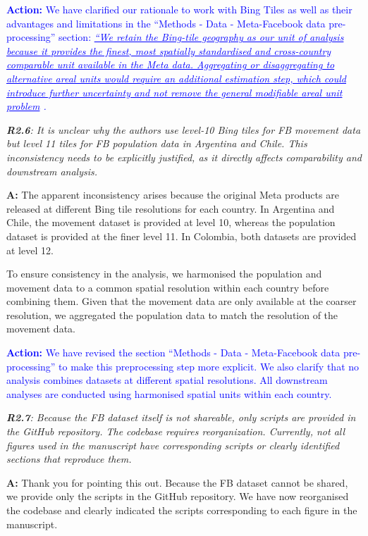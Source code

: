 \documentclass[12pt,a4paper,oneside, reqno]{amsart}
\begin{document}
\textcolor{blue}{\textbf{Action:} We have clarified our rationale to work with Bing Tiles as well as their advantages and limitations in the ``Methods - Data - Meta-Facebook data pre-processing'' section: \textit{\uline{``We retain the Bing-tile geography as our unit of analysis because it provides the finest, most spatially standardised and cross-country comparable unit available in the Meta data. Aggregating or disaggregating to alternative areal units would require an additional estimation step, which could introduce further uncertainty and not remove the general modifiable areal unit problem} \parencite{openshaw83}.}}

\setlength{\leftskip}{0cm} \textit{\textbf{R2.6}: It is unclear why the authors use level-10 Bing tiles for FB movement data but level 11 tiles for FB population data in Argentina and Chile. This inconsistency needs to be explicitly justified, as it directly affects comparability and downstream analysis.}

\setlength{\leftskip}{1cm}\textbf{A:} The apparent inconsistency arises because the original Meta products are released at different Bing tile resolutions for each country. In Argentina and Chile, the movement dataset is provided at level 10, whereas the population dataset is provided at the finer level 11. In Colombia, both datasets are provided at level 12.

To ensure consistency in the analysis, we harmonised the population and movement data to a common spatial resolution within each country before combining them. Given that the movement data are only available at the coarser resolution, we aggregated the population data to match the resolution of the movement data. 

\textcolor{blue}{\textbf{Action:} We have revised the section ``Methods - Data - Meta-Facebook data pre-processing'' to make this preprocessing step more explicit. We also clarify that no analysis combines datasets at different spatial resolutions. All downstream analyses are conducted using harmonised spatial units within each country.}

\setlength{\leftskip}{0cm} \textit{\textbf{R2.7}: Because the FB dataset itself is not shareable, only scripts are provided in the GitHub repository. The codebase requires reorganization. Currently, not all figures used in the manuscript have corresponding scripts or clearly identified sections that reproduce them.}

\setlength{\leftskip}{1cm}\textbf{A:} Thank you for pointing this out. Because the FB dataset cannot be shared, we provide only the scripts in the GitHub repository. We have now reorganised the codebase and clearly indicated the scripts corresponding to each figure in the manuscript.
\end{document}
